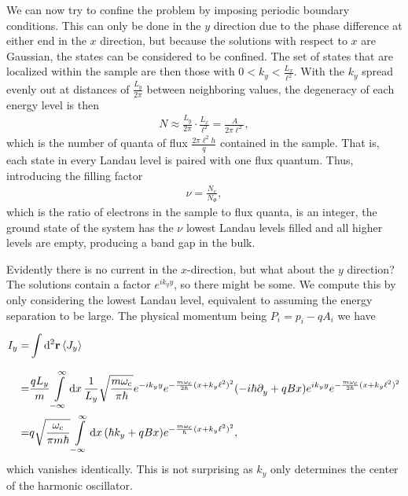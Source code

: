 We can now try to confine the problem by imposing periodic boundary conditions. This can only be done in the $y$ direction due to the phase difference at either end in the $x$ direction, but because the solutions with respect to $x$ are Gaussian, the states can be considered to be confined. The set of states that are localized within the sample are then those with $0 < k_{y} < \frac{L_{x}}{\ell^{2}}$. With the $k_{y}$ spread evenly out at distances of $\frac{L_{y}}{2\pi}$ between neighboring values, the degeneracy of each energy level is then
\begin{align*}
	N \approx \frac{L_{y}}{2\pi}\cdot \frac{L_{x}}{\ell^{2}} = \frac{A}{2\pi\ell^{2}},
\end{align*}
which is the number of quanta of flux $\frac{2\pi\ell^{2}h}{q}$ contained in the sample. That is, each state in every Landau level is paired with one flux quantum. Thus, introducing the filling factor
\begin{align*}
	\nu = \frac{N_{e}}{N_{\Phi}},
\end{align*}
which is the ratio of electrons in the sample to flux quanta, is an integer, the ground state of the system has the $\nu$ lowest Landau levels filled and all higher levels are empty, producing a band gap in the bulk.

Evidently there is no current in the $x$-direction, but what about the $y$ direction? The solutions contain a factor $e^{ik_{y}y}$, so there might be some. We compute this by only considering the lowest Landau level, equivalent to assuming the energy separation to be large. The physical momentum being $P_{i} = p_{i} - qA_{i}$ we have
\begin{align*}
	I_{y} =& \int\limits_{}^{}\dd[2]{\vb{r}}\expval{J_{y}} \\
	      =& \frac{qL_{y}}{m}\int\limits_{-\infty}^{\infty}\dd{x}\frac{1}{L_{y}}\sqrt{\frac{m\omega_{\text{c}}}{\pi\hbar}}e^{-ik_{y}y}e^{-\frac{m\omega_{\text{c}}}{2\hbar}(x + k_{y}\ell^{2})^{2}}(-i\hbar\partial^{}_{y} + qBx)e^{ik_{y}y}e^{-\frac{m\omega_{\text{c}}}{2\hbar}(x + k_{y}\ell^{2})^{2}} \\
	      =& q\sqrt{\frac{\omega_{\text{c}}}{\pi m\hbar}}\int\limits_{-\infty}^{\infty}\dd{x}(\hbar k_{y} + qBx)e^{-\frac{m\omega_{\text{c}}}{\hbar}(x + k_{y}\ell^{2})^{2}},
\end{align*}
which vanishes identically. This is not surprising as $k_{y}$ only determines the center of the harmonic oscillator.

